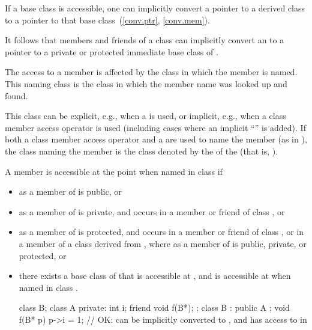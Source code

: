 \pnum
If a base class is accessible, one can implicitly convert a pointer to
a derived class to a pointer to that base class~(\ref{conv.ptr}, \ref{conv.mem}).
\begin{note}
It follows that
members and friends of a class
can implicitly convert an
to a pointer to a private or protected immediate base class of
.
\end{note}
The access to a member is affected by the class in which the member is
named.
This naming class is the class in which the member name was looked
up and found.
\begin{note}
This class can be explicit, e.g., when a
is used, or implicit, e.g., when a class member access operator is used (including cases where an implicit
``''
is
added).
If both a class member access operator and a
are used to name the member (as in
),
the class naming the member is the class denoted by the
of the
(that is,
).
\end{note}
A member
is accessible at the point
when named in class
if
\begin{itemize}
\item
{}
as a member of
is public, or
\item
{}
as a member of
is private, and
occurs in a member or friend of class
,
or
\item
{}
as a member of
is protected, and
occurs in a member or friend of class
,
or in a member of a class
derived from
,
where
as a member of
is public, private, or protected, or
\item
there exists a base class
of
that is accessible at
,
and
is accessible at
when named in class
.
\begin{example}

\begin{codeblock}
class B;
class A {
private:
  int i;
  friend void f(B*);
};
class B : public A { };
void f(B* p) {
  p->i = 1;         // OK:  can be implicitly converted to , and  has access to  in 
}
\end{codeblock}
\end{example}
\end{itemize}

